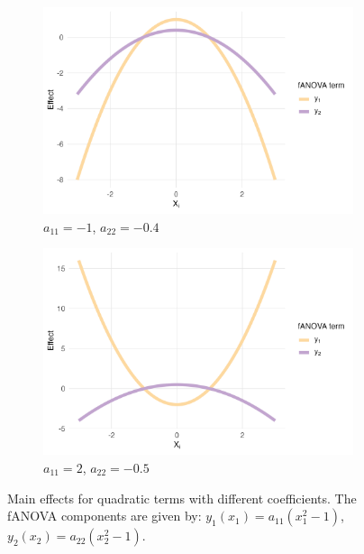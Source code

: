 \begin{figure}[htpb]
    \centering
    \begin{subfigure}[t]{0.49\textwidth}
        \includegraphics[width=\textwidth]{images/experiment_section/quadratic_a1p00_a2p00_a11m10_a22m04_a12p00_rhop00_main.png}
        \caption{$a_{11} = -1$, $a_{22} = -0.4$}
    \end{subfigure}%
    \hfill
    \begin{subfigure}[t]{0.49\textwidth}
        \includegraphics[width=\textwidth]{images/experiment_section/quadratic_a1p00_a2p00_a11p20_a22m05_a12p00_rhop00_main.png}
        \caption{$a_{11} = 2$, $a_{22} = -0.5$}
    \end{subfigure}
    \caption{Main effects for quadratic terms with different coefficients. The fANOVA components are given by: $y_1(x_1) = a_{11}(x_1^2 - 1)$, $y_2(x_2) = a_{22}(x_2^2 - 1)$.}
    \label{fig:quadratic_main_effects}
\end{figure}






